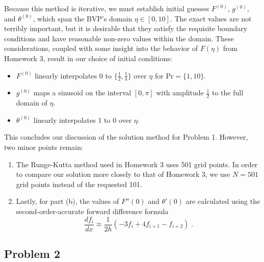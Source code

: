 \documentclass[11pt]{article}
\begin{document}
Because this method is iterative, we must establish initial guesses $F^{(0)}$, $g^{(0)}$, and $\theta^{(0)}$, which span the BVP's domain $\eta \in [0, 10]$. The exact values are not terribly important, but it is desirable that they satisfy the requisite boundary conditions and have reasonable non-zero values within the domain. These considerations, coupled with some insight into the behavior of $F(\eta)$ from Homework 3, result in our choice of initial conditions:
\begin{itemize}
\item $F^{(0)}$ linearly interpolates 0 to $\{\tfrac{1}{2}, \tfrac{1}{4}\}$ over $\eta$ for $\text{Pr} = \{1, 10\}$.
\item $g^{(0)}$ maps a sinusoid on the interval $[0, \pi]$ with amplitude $\tfrac{1}{2}$ to the full domain of $\eta$.
\item $\theta^{(0)}$ linearly interpolates 1 to 0 over $\eta$.
\end{itemize}

This concludes our discussion of the solution method for Problem 1. However, two minor points remain:

\begin{enumerate}

\item The Runge-Kutta method used in Homework 3 uses 501 grid points. In order to compare our solution more closely to that of Homework 3, we use $N = 501$ grid points instead of the requested 101.

\item Lastly, for part (b), the values of $F''(0)$ and $\theta'(0)$ are calculated using the second-order-accurate forward difference formula
\begin{equation}
\frac{d f_i}{d x}
\approx
\frac{1}{2h} \left( -3 f_i + 4 f_{i+1} - f_{i+2} \right)
\;.
\end{equation}

\end{enumerate}

\subsection{Problem 2}
\end{document}
